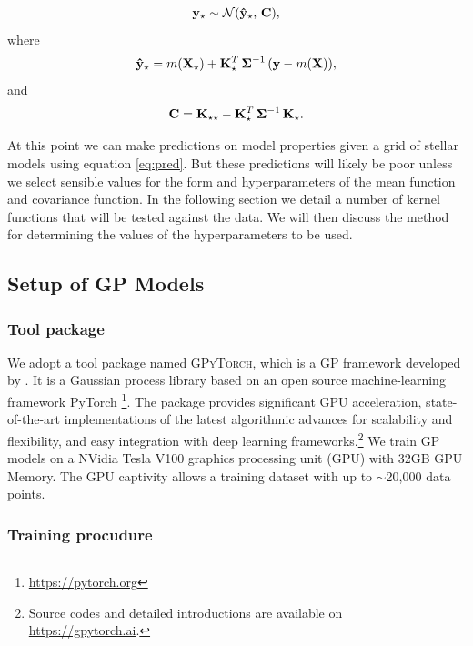 \begin{equation}
{\bf y}_{\star} \sim \mathcal{N}(\bf \hat{y}_{\star}, \, \bf C),
\label{eq:pred}
\end{equation}
where 
\begin{equation}
{\bf \hat{y}}_{\star} = m({\bf X}_{\star}) + {\bf K}_{\star}^{T} \, {\bf \Sigma}^{-1} \, ({\bf y} - m(\bf X)),
\end{equation}
and 
\begin{equation}
{\bf C} = {\bf K}_{\star \star} - {\bf K}_{\star}^{T} \, {\bf \Sigma}^{-1} \, {\bf K_{\star}}.
\end{equation}

At this point we can make predictions on model properties given a grid of stellar models using equation \ref{eq:pred}.  But these predictions will likely be poor unless we select sensible values for the form and hyperparameters of the mean function and covariance function.  In the following section we detail a number of kernel functions that will be tested against the data.  We will then discuss the method for determining the values of the hyperparameters to be used.


\subsection{Setup of GP Models}\label{sec:setup}

\subsubsection{Tool package}

We adopt a tool package named \textsc{GPyTorch}, which is a GP framework developed by \citet{gardner2018gpytorch}. It is a Gaussian process library based on an open source machine-learning framework PyTorch \footnote{\url{https://pytorch.org}}. The package provides significant GPU acceleration, state-of-the-art implementations of the latest algorithmic advances for scalability and flexibility, and easy integration with deep learning frameworks.\footnote{Source codes and detailed introductions are available on \url{https://gpytorch.ai}.} 
%
We train GP models on a NVidia Tesla V100 graphics processing unit (GPU) with 32GB GPU Memory. The GPU captivity allows a training dataset with up to $\sim$20,000 data points. 


\subsubsection{Training procudure}

